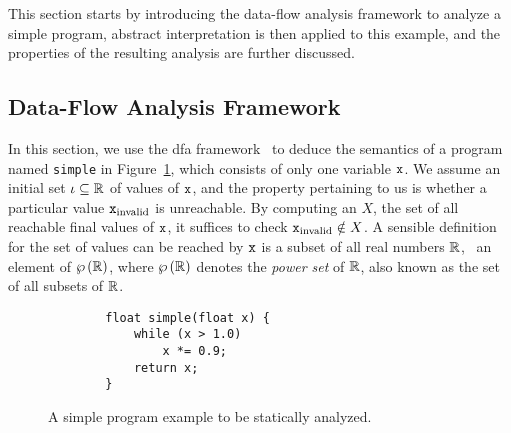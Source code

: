 This section starts by introducing the data-flow analysis framework to analyze
a simple program, abstract interpretation is then applied to this example, and
the properties of the resulting analysis are further discussed.


\subsection{Data-Flow Analysis Framework}
\label{bg:sub:data_flow}

In this section, we use the \gls{dfa} framework~\cite{nielson99} to deduce
the semantics of a program named \verb|simple| in Figure~\ref{bg:lst:simple},
which consists of only one variable $\texttt{x}$.  We assume an initial set $\iota
\subseteq \mathbb{R}$ of values of $\texttt{x}$, and the property pertaining to us
is whether a particular value $\texttt{x}_\mathrm{invalid}$ is unreachable.  By
computing an $X$, the set of all reachable final values of $\texttt{x}$, it suffices
to check $\texttt{x}_\mathrm{invalid} \notin X$.  A sensible definition for the set
of values can be reached by $\texttt{x}$ is a subset of all real numbers $\mathbb{R}$,
\ie~an element of $\wp\left({\mathbb{R}}\right)$, where $\wp\left({\mathbb{R}}\right)$ denotes
the \emph{power set} of $\mathbb{R}$, also known as the set of all subsets of
$\mathbb{R}$.
\begin{figure}[ht]
    \begin{lstlisting}
        float simple(float x) {
            while (x > 1.0)
                x *= 0.9;
            return x;
        }
    \end{lstlisting}
    \caption{%
        A simple program example to be statically analyzed.
    }\label{bg:lst:simple}
\end{figure}


